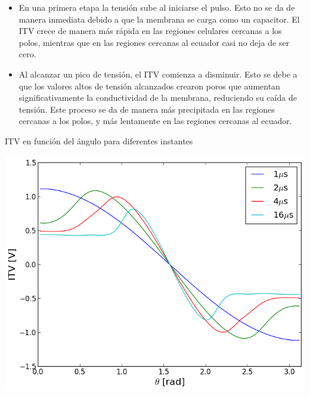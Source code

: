 \documentclass[a0,portrait]{a0poster}
\begin{document}
\begin{multicols}{2}
\begin{multicols}{2}
\begin{center}
		\end{center}\vspace{1cm}
	\end{multicols}

\begin{itemize}
	\item En una primera etapa la tensión sube al iniciarse el pulso. Esto no se da de manera inmediata debido a que la membrana se carga como un capacitor. El ITV crece de manera más rápida en las regiones celulares cercanas a los polos, mientras que en las regiones cercanas al ecuador casi no deja de ser cero.
	\item Al alcanzar un pico de tensión, el ITV comienza a disminuir. Esto se debe a que los valores altos de tensión alcanzados crearon poros que aumentan significativamente la conductividad de la membrana, reduciendo su caída de tensión. Este proceso se da de manera más precipitada en las regiones cercanas a los polos, y más lentamente en las regiones cercanas al ecuador. 
\end{itemize}

\begin{multicols}{2}
	ITV en función del ángulo para diferentes instantes
	\begin{center}\vspace{1cm}
	\includegraphics[width=1\linewidth]{itv-tita-50-64-80KVm}
	\end{center}\vspace{1cm}
	

\end{multicols}
\end{multicols}
\end{document}
